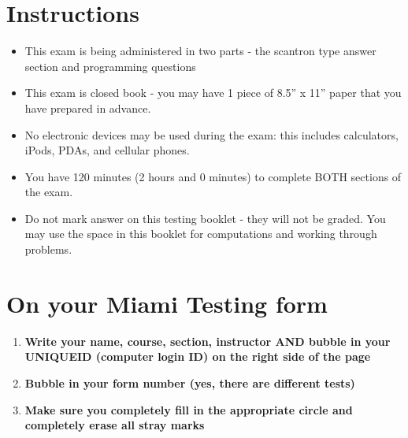 \documentclass[11pt,answers]{exam}
\begin{document}
\begin{center} 
\end{center} 

\lstset{language=Java,numbers=left, numberstyle=\tiny, stepnumber=1, numbersep=5pt, showstringspaces=true}

\vspace{0.1in} 

\section*{Instructions}
\begin{itemize}
 \item This exam is being administered in two parts - the scantron type answer section and programming questions
 \item This exam is closed book - you may have 1 piece of 8.5” x 11” paper that you have prepared in advance.
 \item No electronic devices may be used during the exam: this includes calculators, iPods, PDAs, and cellular phones. 
 \item You have 120 minutes (2 hours and 0 minutes) to complete BOTH sections of the exam. 
 \item Do not mark answer on this testing booklet - they will not be graded.   You may use the space in this booklet for computations and working through problems.
\end{itemize}

\section*{On your Miami Testing form}
\begin{enumerate}
	\item {\bf Write your name, course, section, instructor AND bubble in your UNIQUEID (computer login ID) on the right side of the page}
	\item {\bf Bubble in your form number (yes, there are different tests)}
	\item {\bf Make sure you completely fill in the appropriate circle and completely erase all stray marks}
\end{enumerate}	
\end{document}
